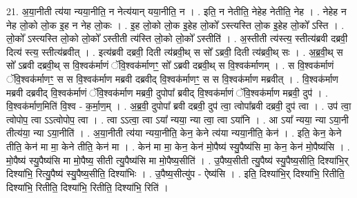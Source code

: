 \documentclass[17pt]{extarticle}
\begin{document}
21. अ॒या॒नीती त्य॑या न्यया॒नीति॒ न नेत्य॑यान् यया॒नीति॒ न । . इति॒ न नेतीति॒ नेहेह नेतीति॒ नेह । . नेहेह न नेह लो॒को लो॒क इ॒ह न नेह लो॒कः । . इ॒ह लो॒को लो॒क इ॒हेह लो॒को᳚ ऽस्त्यस्ति लो॒क इ॒हेह लो॒को᳚ ऽस्ति । . लो॒को᳚ ऽस्त्यस्ति लो॒को लो॒को᳚ ऽस्तीती त्य॑स्ति लो॒को लो॒को᳚ ऽस्तीति॑ । . अ॒स्तीती त्य॑स्त्य॒ स्तीत्य॑ब्रवी दब्रवी॒ दित्य॑ स्त्य॒ स्तीत्य॑ब्रवीत् । . इत्य॑ब्रवी दब्रवी॒ दिती त्य॑ब्रवी॒थ् स सो᳚ ऽब्रवी॒ दिती त्य॑ब्रवी॒थ् सः । . अ॒ब्र॒वी॒थ् स सो᳚ ऽब्रवी दब्रवी॒थ् स वि॒श्वक॑र्माणं ॅवि॒श्वक॑र्माणꣳ॒॒ सो᳚ ऽब्रवी दब्रवी॒थ् स वि॒श्वक॑र्माणम् । . स वि॒श्वक॑र्माणं ॅवि॒श्वक॑र्माणꣳ॒॒ स स वि॒श्वक॑र्माण मब्रवी दब्रवीद् वि॒श्वक॑र्माणꣳ॒॒ स स वि॒श्वक॑र्माण मब्रवीत् । . वि॒श्वक॑र्माण मब्रवी दब्रवीद् वि॒श्वक॑र्माणं ॅवि॒श्वक॑र्माण मब्रवी॒ दुपोपा᳚ ब्रवीद् वि॒श्वक॑र्माणं ॅवि॒श्वक॑र्माण मब्रवी॒ दुप॑ । . वि॒श्वक॑र्माण॒मिति॑ वि॒श्व - क॒र्मा॒ण॒म् । . अ॒ब्र॒वी॒ दुपोपा᳚ ब्रवी दब्रवी॒ दुप॑ त्वा॒ त्वोपा᳚ब्रवी दब्रवी॒ दुप॑ त्वा । . उप॑ त्वा॒ त्वोपोप॒ त्वा ऽऽत्वोपोप॒ त्वा । . त्वा ऽऽत्वा॒ त्वा ऽया᳚ न्यया॒ न्या त्वा॒ त्वा ऽया॑नि । . आ ऽया᳚ न्यया॒ न्या ऽया॒नी तीत्य॑या॒ न्या ऽया॒नीति॑ । . अ॒या॒नीती त्य॑या न्यया॒नीति॒ केन॒ केने त्य॑या न्यया॒नीति॒ केन॑ । . इति॒ केन॒ केने तीति॒ केन॑ मा मा॒ केने तीति॒ केन॑ मा । . केन॑ मा मा॒ केन॒ केन॑ मो॒पैष्य॑ स्यु॒पैष्य॑सि मा॒ केन॒ केन॑ मो॒पैष्य॑सि । . मो॒पैष्य॑ स्यु॒पैष्य॑सि मा मो॒पैष्य॒ सीती त्यु॒पैष्य॑सि मा मो॒पैष्य॒सीति॑ । . उ॒पैष्य॒सीती त्यु॒पैष्य॑ स्यु॒पैष्य॒सीति॒ दिश्या॑भि॒र् दिश्या॑भि॒ रित्यु॒पैष्य॑ स्यु॒पैष्य॒सीति॒ दिश्या॑भिः । . उ॒पैष्य॒सीत्यु॑प - ऐष्य॑सि । . इति॒ दिश्या॑भि॒र् दिश्या॑भि॒ रितीति॒ दिश्या॑भि॒ रितीति॒ दिश्या॑भि॒ रितीति॒ दिश्या॑भि॒ रिति॑ । \newline
\end{document}
